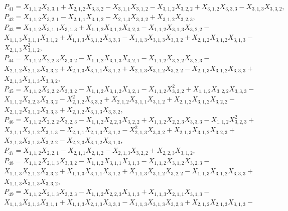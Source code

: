 \documentclass[10pt]{beamer}
\begin{document}
$P_{41}=X_{1,1,2}X_{3,3,1}+X_{2,1,2}X_{3,3,2}-X_{3,1,1}X_{3,1,2}-X_{3,1,2}X_{3,2,2}+X_{3,1,2}X_{3,3,3}-X_{3,1,3}X_{3,3,2},$\\
$P_{42}=X_{1,1,2}X_{3,2,1}-X_{2,1,1}X_{3,1,2}-X_{2,1,3}X_{3,3,2}+X_{3,1,2}X_{3,2,3},$\\
$P_{43}=X_{1,1,2}X_{3,1,1}X_{3,1,3}+X_{1,1,2}X_{3,1,2}X_{3,2,3}-X_{1,1,2}X_{3,1,3}X_{3,2,2}-$\\
$X_{1,1,3}X_{3,1,1}X_{3,1,2}+X_{1,1,3}X_{3,1,2}X_{3,3,3}-X_{1,1,3}X_{3,1,3}X_{3,3,2}+X_{2,1,2}X_{3,1,2}X_{3,1,3}-$\\
$X_{2,1,3}X_{3,1,2}^2,$\\
$P_{44}=X_{1,1,2}X_{2,2,3}X_{3,3,2}-X_{1,1,2}X_{3,1,3}X_{3,2,1}-X_{1,1,2}X_{3,2,2}X_{3,2,3}-$\\
$X_{2,1,2}X_{2,1,3}X_{3,3,2}+X_{2,1,3}X_{3,1,1}X_{3,1,2}+X_{2,1,3}X_{3,1,2}X_{3,2,2}-X_{2,1,3}X_{3,1,2}X_{3,3,3}+$\\
$X_{2,1,3}X_{3,1,3}X_{3,3,2},$\\
$P_{45}=X_{1,1,2}X_{2,2,2}X_{3,3,2}-X_{1,1,2}X_{3,1,2}X_{3,2,1}-X_{1,1,2}X_{3,2,2}^2+X_{1,1,2}X_{3,2,2}X_{3,3,3}-$\\
$X_{1,1,2}X_{3,2,3}X_{3,3,2}-X_{2,1,2}^2X_{3,3,2}+X_{2,1,2}X_{3,1,1}X_{3,1,2}+X_{2,1,2}X_{3,1,2}X_{3,2,2}-$\\
$X_{2,1,2}X_{3,1,2}X_{3,3,3}+X_{2,1,2}X_{3,1,3}X_{3,3,2},$\\
$P_{46}=X_{1,1,2}X_{2,2,2}X_{3,2,3}-X_{1,1,2}X_{2,2,3}X_{3,2,2}+X_{1,1,2}X_{2,2,3}X_{3,3,3}-X_{1,1,2}X_{3,2,3}^2+$\\
$X_{2,1,1}X_{2,1,2}X_{3,1,3}-X_{2,1,1}X_{2,1,3}X_{3,1,2}-X_{2,1,3}^2X_{3,3,2}+X_{2,1,3}X_{3,1,2}X_{3,2,3}+$\\
$X_{2,1,3}X_{3,1,3}X_{3,2,2}-X_{2,2,3}X_{3,1,2}X_{3,1,3},$\\
$P_{47}=X_{1,1,2}X_{2,2,1}-X_{2,1,1}X_{2,1,2}-X_{2,1,3}X_{3,2,2}+X_{2,2,3}X_{3,1,2},$\\
$P_{48}=X_{1,1,2}X_{2,1,3}X_{3,3,2}-X_{1,1,2}X_{3,1,1}X_{3,1,3}-X_{1,1,2}X_{3,1,2}X_{3,2,3}-$\\
$X_{1,1,3}X_{2,1,2}X_{3,3,2}+X_{1,1,3}X_{3,1,1}X_{3,1,2}+X_{1,1,3}X_{3,1,2}X_{3,2,2}-X_{1,1,3}X_{3,1,2}X_{3,3,3}+$\\
$X_{1,1,3}X_{3,1,3}X_{3,3,2},$\\
$P_{49}=X_{1,1,2}X_{2,1,3}X_{3,2,3}-X_{1,1,2}X_{2,2,3}X_{3,1,3}+X_{1,1,3}X_{2,1,1}X_{3,1,3}-$\\
$X_{1,1,3}X_{2,1,3}X_{3,1,1}+X_{1,1,3}X_{2,1,3}X_{3,3,3}-X_{1,1,3}X_{3,1,3}X_{3,2,3}+X_{2,1,2}X_{2,1,3}X_{3,1,3}-$\\
\end{document}
